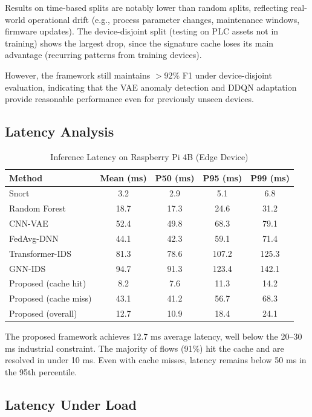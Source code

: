 \documentclass[preprint,12pt]{elsarticle}
\begin{document}
Results on time-based splits are notably lower than random splits, reflecting real-world operational drift (e.g., process parameter changes, maintenance windows, firmware updates). The device-disjoint split (testing on PLC assets not in training) shows the largest drop, since the signature cache loses its main advantage (recurring patterns from training devices).

However, the framework still maintains $>92\%$ F1 under device-disjoint evaluation, indicating that the VAE anomaly detection and DDQN adaptation provide reasonable performance even for previously unseen devices.

\subsection{Latency Analysis}

\begin{table}[!t]
\caption{Inference Latency on Raspberry Pi 4B (Edge Device)}
\label{tab:latency_rpi}
\centering
\small
\begin{tabular}{@{}lcccc@{}}
\toprule
\textbf{Method} & \textbf{Mean (ms)} & \textbf{P50 (ms)} & \textbf{P95 (ms)} & \textbf{P99 (ms)} \\
\midrule
Snort & 3.2 & 2.9 & 5.1 & 6.8 \\
Random Forest & 18.7 & 17.3 & 24.6 & 31.2 \\
CNN-VAE & 52.4 & 49.8 & 68.3 & 79.1 \\
FedAvg-DNN & 44.1 & 42.3 & 59.1 & 71.4 \\
Transformer-IDS & 81.3 & 78.6 & 107.2 & 125.3 \\
GNN-IDS & 94.7 & 91.3 & 123.4 & 142.1 \\
\midrule
Proposed (cache hit) & 8.2 & 7.6 & 11.3 & 14.2 \\
Proposed (cache miss) & 43.1 & 41.2 & 56.7 & 68.3 \\
Proposed (overall) & 12.7 & 10.9 & 18.4 & 24.1 \\
\bottomrule
\end{tabular}
\end{table}

The proposed framework achieves 12.7 ms average latency, well below the 20--30 ms industrial constraint. The majority of flows (91\%) hit the cache and are resolved in under 10 ms. Even with cache misses, latency remains below 50 ms in the 95th percentile.

\subsection{Latency Under Load}
\end{document}
